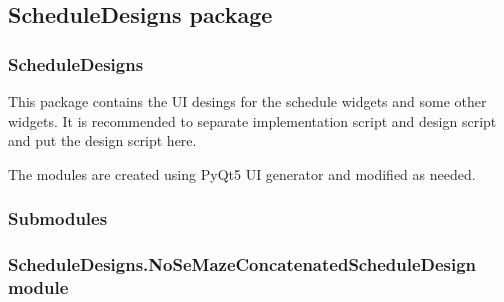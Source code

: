 \documentclass[letterpaper,10pt,english]{sphinxmanual}
\begin{document}
\subsection{ScheduleDesigns package}
\label{\detokenize{NoSeMazeSchedule/ScheduleDesigns:scheduledesigns-package}}\label{\detokenize{NoSeMazeSchedule/ScheduleDesigns::doc}}

\subsubsection{ScheduleDesigns}
\label{\detokenize{NoSeMazeSchedule/ScheduleDesigns:scheduledesigns}}
\sphinxAtStartPar
This package contains the UI desings for the schedule widgets and some other widgets. It is recommended to separate implementation script and design script and put the design script here.

\sphinxAtStartPar
The modules are created using PyQt5 UI generator and modified as needed.


\subsubsection{Submodules}
\label{\detokenize{NoSeMazeSchedule/ScheduleDesigns:submodules}}

\subsubsection{ScheduleDesigns.NoSeMazeConcatenatedScheduleDesign module}
\label{\detokenize{NoSeMazeSchedule/ScheduleDesigns:module-ScheduleDesigns.NoSeMazeConcatenatedScheduleDesign}}\label{\detokenize{NoSeMazeSchedule/ScheduleDesigns:scheduledesigns-nosemazeconcatenatedscheduledesign-module}}
\end{document}
